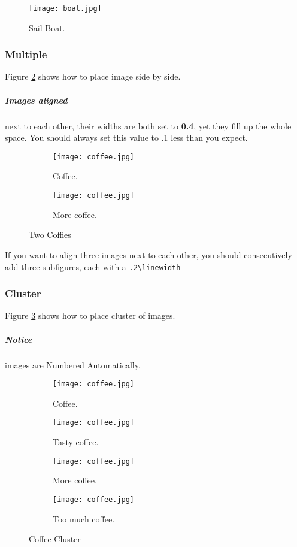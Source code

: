 \documentclass{report}[a4paper,12pt] %
\begin{document}
\begin{figure}[h]
  \texttt{[image: boat.jpg]}
  \caption{Sail Boat.}
  \label{fig:sailboat} %
\end{figure}

\subsubsection{Multiple}
Figure \ref{fig:coffee} shows how to place image side by side.

\subparagraph{Images aligned} next to each other, their widths are both set to \textbf{0.4}, yet they fill up the whole space.
You should always set this value to .1 less than you expect.

\begin{figure}[h!]
  \centering
  \begin{subfigure}[b]{0.4\linewidth}
    \texttt{[image: coffee.jpg]}
    \caption{Coffee.}
  \end{subfigure}
  \begin{subfigure}[b]{0.4\linewidth}
    \texttt{[image: coffee.jpg]}
    \caption{More coffee.}
  \end{subfigure}
  \caption{Two Coffies}
  \label{fig:coffee}
\end{figure}

If you want to align three images next to each other,
you should consecutively add three subfigures, each with a \verb|.2\linewidth|


\subsubsection{Cluster}
Figure \ref{fig:coffee3} shows how to place cluster of images.

\subparagraph{Notice} images are Numbered Automatically.

\begin{figure}[h!]
  \centering
  \begin{subfigure}[b]{0.2\linewidth}
    \texttt{[image: coffee.jpg]}
     \caption{Coffee.}
  \end{subfigure}
  \begin{subfigure}[b]{0.2\linewidth}
    \texttt{[image: coffee.jpg]}
    \caption{Tasty coffee.}
  \end{subfigure}
  \begin{subfigure}[b]{0.2\linewidth}
    \texttt{[image: coffee.jpg]}
    \caption{More coffee.}
  \end{subfigure}
  \begin{subfigure}[b]{0.5\linewidth}
    \texttt{[image: coffee.jpg]}
    \caption{Too much coffee.}
  \end{subfigure}
  \caption{Coffee Cluster}
  \label{fig:coffee3}
\end{figure}
\end{document}
